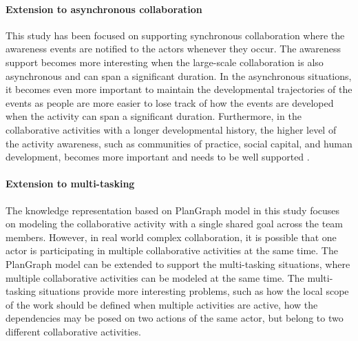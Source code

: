 \paragraph*{Extension to asynchronous collaboration} %
\label{par:extension_to_asynchronous_collaboration}
This study has been focused on supporting synchronous collaboration where the awareness events are notified to the actors whenever they occur. The awareness support becomes more interesting when the large-scale collaboration is also asynchronous and can span a significant duration. In the asynchronous situations, it becomes even more important to maintain the developmental trajectories of the events as people are more easier to lose track of how the events are developed when the activity can span a significant duration. Furthermore, in the collaborative activities with a longer developmental history, the higher level of the activity awareness, such as communities of practice, social capital, and human development, becomes more important and needs to be well supported \cite{carroll2006a}.

\paragraph*{Extension to multi-tasking} %
\label{par:extension_to_multi_tasking}
The knowledge representation based on PlanGraph model in this study focuses on modeling the collaborative activity with a single shared goal across the team members. However, in real world complex collaboration, it is possible that one actor is participating in multiple collaborative activities at the same time. The PlanGraph model can be extended to support the multi-tasking situations, where multiple collaborative activities can be modeled at the same time. The multi-tasking situations provide more interesting problems, such as how the local scope of the work should be defined when multiple activities are active, how the dependencies may be posed on two actions of the same actor, but belong to two different collaborative activities.




 

